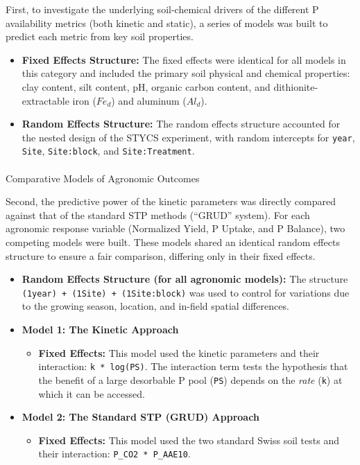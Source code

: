 \documentclass[
  a4paper,
]{article}
\makeatletter
\let\oldparagraph\paragraph
\renewcommand{\paragraph}{
    \@ifstar
      \xxxParagraphStar
      \xxxParagraphNoStar
  }
\newcommand{\xxxParagraphStar}[1]{\oldparagraph*{#1}\mbox{}}
\newcommand{\xxxParagraphNoStar}[1]{\oldparagraph{#1}\mbox{}}
\providecommand{\tightlist}{%
  \setlength{\itemsep}{0pt}\setlength{\parskip}{0pt}}
\makeatother
\begin{document}
First, to investigate the underlying soil-chemical drivers of the
different P availability metrics (both kinetic and static), a series of
models was built to predict each metric from key soil properties.

\begin{itemize}
\tightlist
\item
  \textbf{Fixed Effects Structure:} The fixed effects were identical for
  all models in this category and included the primary soil physical and
  chemical properties: clay content, silt content, pH, organic carbon
  content, and dithionite-extractable iron (\(Fe_d\)) and aluminum
  (\(Al_d\)).
\item
  \textbf{Random Effects Structure:} The random effects structure
  accounted for the nested design of the STYCS experiment, with random
  intercepts for \texttt{year}, \texttt{Site}, \texttt{Site:block}, and
  \texttt{Site:Treatment}.
\end{itemize}

\paragraph{Comparative Models of Agronomic
Outcomes}\label{comparative-models-of-agronomic-outcomes}

Second, the predictive power of the kinetic parameters was directly
compared against that of the standard STP methods (``GRUD'' system). For
each agronomic response variable (Normalized Yield, P Uptake, and P
Balance), two competing models were built. These models shared an
identical random effects structure to ensure a fair comparison,
differing only in their fixed effects.

\begin{itemize}
\item
  \textbf{Random Effects Structure (for all agronomic models):} The
  structure
  \texttt{(1\textbar{}year)\ +\ (1\textbar{}Site)\ +\ (1\textbar{}Site:block)}
  was used to control for variations due to the growing season,
  location, and in-field spatial differences.
\item
  \textbf{Model 1: The Kinetic Approach}

  \begin{itemize}
  \tightlist
  \item
    \textbf{Fixed Effects:} This model used the kinetic parameters and
    their interaction: \texttt{k\ *\ log(PS)}. The interaction term
    tests the hypothesis that the benefit of a large desorbable P pool
    (\texttt{PS}) depends on the \emph{rate} (\texttt{k}) at which it
    can be accessed.
  \end{itemize}
\item
  \textbf{Model 2: The Standard STP (GRUD) Approach}

  \begin{itemize}
  \tightlist
  \item
    \textbf{Fixed Effects:} This model used the two standard Swiss soil
    tests and their interaction: \texttt{P\_CO2\ *\ P\_AAE10}.
  \end{itemize}
\end{itemize}
\end{document}
